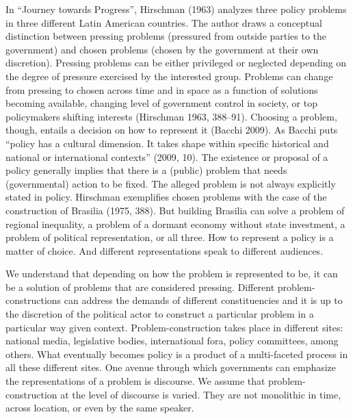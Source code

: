 \documentclass[
]{article}
\begin{document}
In ``Journey towards Progress'', Hirschman (1963) analyzes three policy
problems in three different Latin American countries. The author draws a
conceptual distinction between pressing problems (pressured from outside
parties to the government) and chosen problems (chosen by the government
at their own discretion). Pressing problems can be either privileged or
neglected depending on the degree of pressure exercised by the
interested group. Problems can change from pressing to chosen across
time and in space as a function of solutions becoming available,
changing level of government control in society, or top policymakers
shifting interests (Hirschman 1963, 388--91). Choosing a problem,
though, entails a decision on how to represent it (Bacchi 2009). As
Bacchi puts ``policy has a cultural dimension. It takes shape within
specific historical and national or international contexts'' (2009, 10).
The existence or proposal of a policy generally implies that there is a
(public) problem that needs (governmental) action to be fixed. The
alleged problem is not always explicitly stated in policy. Hirschman
exemplifies chosen problems with the case of the construction of
Brasilia (1975, 388). But building Brasilia can solve a problem of
regional inequality, a problem of a dormant economy without state
investment, a problem of political representation, or all three. How to
represent a policy is a matter of choice. And different representations
speak to different audiences.

We understand that depending on how the problem is represented to be, it
can be a solution of problems that are considered pressing. Different
problem-constructions can address the demands of different
constituencies and it is up to the discretion of the political actor to
construct a particular problem in a particular way given context.
Problem-construction takes place in different sites: national media,
legislative bodies, international fora, policy committees, among others.
What eventually becomes policy is a product of a multi-faceted process
in all these different sites. One avenue through which governments can
emphasize the representations of a problem is discourse. We assume that
problem-construction at the level of discourse is varied. They are not
monolithic in time, across location, or even by the same speaker.
\end{document}
